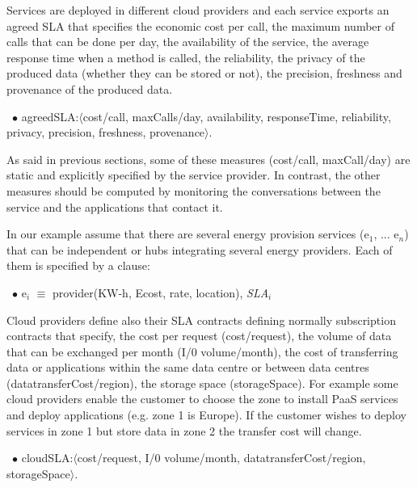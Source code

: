 Services are deployed in different cloud providers and each service exports an agreed SLA that specifies the economic cost per call, the maximum number of calls that can be done per day, the availability of the service, the average response time when a method is called, the reliability, the privacy of the produced data (whether they can be stored or not), the precision, freshness and provenance of the produced data. 

\begin{trivlist}\sf\footnotesize
\item[~$\bullet$ ] {\sf agreedSLA:$\langle$cost/call, maxCalls/day, availability, responseTime, reliability, privacy, precision, freshness, provenance$\rangle$}. 
  
 \end{trivlist}
 
As said in previous sections, some of these measures ({\sf cost/call, maxCall/day}) are static and explicitly specified by the service provider. 
In contrast, the other measures should be computed by monitoring the conversations between the service and the applications that contact it.  

In our example assume that there are several energy provision services ({\sf e$_1$, ... e$_n$}) that can be independent or hubs integrating several energy providers. 
Each of them is specified by a clause:
\begin{trivlist}\sf\footnotesize
\item[~$\bullet$ ]   e$_i$ $\equiv$ provider(KW-h, Ecost, rate, location), \textit{SLA}$_i$
\end{trivlist}

Cloud providers define also their SLA contracts defining normally subscription contracts that specify, the cost per request ({\sf cost/request}), the volume of data that can be exchanged per month ({\sf I/0 volume/month}), the cost of transferring data or applications within the same data centre or between data centres ({\sf datatransferCost/region}), the storage space ({\sf storageSpace}). For example some cloud providers enable the customer to choose the zone to install PaaS services and deploy applications (e.g. zone 1 is Europe). If the customer wishes to deploy services in zone 1 but store data in zone 2 the transfer cost will change.

\begin{trivlist}\sf\footnotesize
% 
 \item[~$\bullet$ ]  {\sf cloudSLA:$\langle$cost/request, I/0 volume/month, datatransferCost/region, storageSpace$\rangle$}. 
 \end{trivlist}
 

